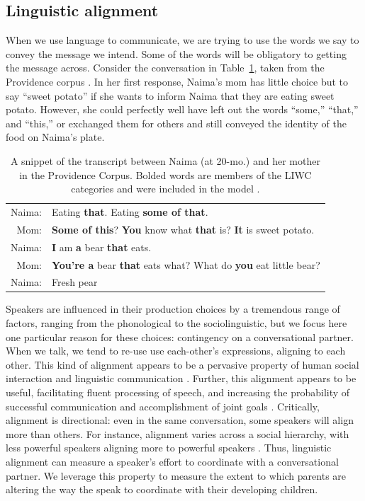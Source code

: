 \documentclass[10pt,letterpaper]{article}
\begin{document}
\subsection{Linguistic alignment}

When we use language to communicate, we are trying to use the words we say to convey the message we intend. Some of the words will be obligatory to getting the message across. Consider the conversation in Table~\ref{tab:naima}, taken from the Providence corpus \cite{demuth2006}. In her first response, Naima's mom has little choice but to say ``sweet potato'' if she wants to inform Naima that they are eating sweet potato. However, she could perfectly well have left out the words ``some,'' ``that,'' and ``this,'' or exchanged them for others and still conveyed the identity of the food on Naima's plate.

\begin{table}[tb]
\begin{tabular}{r p{}}
\hline
Naima: & Eating \textbf{that}. Eating \textbf{some of that}.\\

Mom: & \textbf{Some of this}? \textbf{You} know what \textbf{that} is? \textbf{It} is sweet potato.\\

Naima: & \textbf{I} am \textbf{a} bear \textbf{that} eats.\\

Mom: & \textbf{You're a} bear \textbf{that} eats what? What do \textbf{you} eat little bear?\\

Naima: & Fresh pear\\
\hline
\end{tabular}
\caption{\label{tab:naima}A snippet of the transcript between Naima (at 20-mo.) and her mother in the Providence Corpus. Bolded words are members of the LIWC categories and were included in the model \cite{pennebaker2007}. }
\end{table}

Speakers are influenced in their production choices by a tremendous range of factors, ranging from the phonological to the sociolinguistic, but we focus here one particular reason for these choices: contingency on a conversational partner. When we talk, we tend to re-use use each-other's expressions, aligning to each other. This kind of alignment appears to be a pervasive property of human social interaction and linguistic communication \cite{giles1991, garrod2004}. Further, this alignment appears to be useful, facilitating fluent processing of speech, and increasing the probability of successful communication and accomplishment of joint goals \cite{ireland2011, fusaroli2012}. Critically, alignment is directional: even in the same conversation, some speakers will align more than others. For instance, alignment varies across a social hierarchy, with less powerful speakers aligning more to powerful speakers \cite{kacewicz2013}. Thus, linguistic alignment can measure a speaker's effort to  coordinate with a conversational partner. We leverage this property to measure the extent to which parents are altering the way the speak to coordinate with their developing children.
\end{document}
